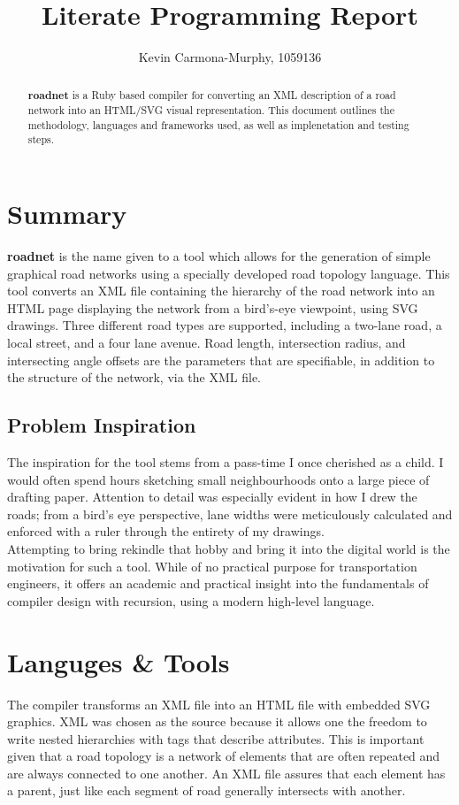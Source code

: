 \documentclass{article}
\begin{document}
\title{Literate Programming Report}
\author{Kevin Carmona-Murphy, 1059136}

\maketitle

\begin{abstract}
\textbf{roadnet} is a Ruby based compiler for converting an XML description of a road network into an HTML/SVG visual representation. This document outlines the methodology, languages and frameworks used, as well as implenetation and testing steps.
\end{abstract}

\section{Summary}
\textbf{roadnet} is the name given to a tool which allows for the generation of simple graphical road networks using a specially developed road topology language. This tool converts an XML file containing the hierarchy of the road network into an HTML page displaying the network from a bird's-eye viewpoint, using SVG drawings. Three different road types are supported, including a two-lane road, a local street, and a four lane avenue. Road length, intersection radius, and intersecting angle offsets are the parameters that are specifiable, in addition to the structure of the network, via the XML file.

\subsection{Problem Inspiration}
The inspiration for the tool stems from a pass-time I once cherished as a child. I would often spend hours sketching small neighbourhoods onto a large piece of drafting paper. Attention to detail was especially evident in how I drew the roads; from a bird's eye perspective, lane widths were meticulously calculated and enforced with a ruler through the entirety of my drawings.\\

Attempting to bring rekindle that hobby and bring it into the digital world is the motivation for such a tool. While of no practical purpose for transportation engineers, it offers an academic and practical insight into the fundamentals of compiler design with recursion, using a modern high-level language.

\section{Languges \& Tools}
The compiler transforms an XML file into an HTML file with embedded SVG graphics. XML was chosen as the source because it allows one the freedom to write nested hierarchies with tags that describe attributes. This is important given that a road topology is a network of elements that are often repeated and are always connected to one another. An XML file assures that each element has a parent, just like each segment of road generally intersects with another.\\
\end{document}
